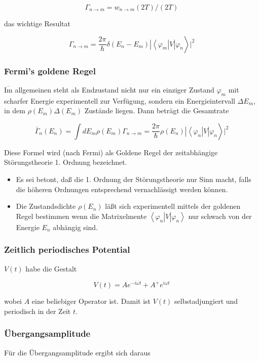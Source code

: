 \documentclass[10pt, letterpaper]{article}
\begin{document}
$$
\Gamma_{n \rightarrow m}=w_{n \rightarrow m}(2 T) /(2 T)
$$

das wichtige Resultat

$$
\left.\Gamma_{n \rightarrow m}=\frac{2 \pi}{\hbar} \delta\left(E_{n}-E_{m}\right)\left|\left\langle\varphi_{m}\right| V\right| \varphi_{n}\right\rangle\left.\right|^{2}
$$

\subsubsection*{Fermi's goldene Regel}
$\overline{\mathrm{Im}}$ allgemeinen steht als Endzustand nicht nur ein einziger Zustand $\varphi_{m}$ mit scharfer Energie experimentell zur Verfügung, sondern ein Energieintervall $\Delta E_{m}$, in dem $\rho\left(E_{m}\right) \Delta\left(E_{m}\right)$ Zustände liegen. Dann beträgt die Gesamtrate

$$
\left.\bar{\Gamma}_{n}\left(E_{n}\right)=\int d E_{m} \rho\left(E_{m}\right) \Gamma_{n \rightarrow m}=\frac{2 \pi}{\hbar} \rho\left(E_{n}\right)\left|\left\langle\varphi_{n}\right| V\right| \varphi_{n}\right\rangle\left.\right|^{2}
$$

Diese Formel wird (nach Fermi) als Goldene Regel der zeitabhängige Störungstheorie 1. Ordnung bezeichnet.

\begin{itemize}
  \item Es sei betont, daß die 1. Ordnung der Störungstheorie nur Sinn macht, falls die höheren Ordnungen entsprechend vernachlässigt werden können.
  \item Die Zustandsdichte $\rho\left(E_{n}\right)$ läßt sich experimentell mittels der goldenen Regel bestimmen wenn die Matrixelmente $\left\langle\varphi_{n}\right| V\left|\varphi_{n}\right\rangle$ nur schwach von der Energie $E_{n}$ abhängig sind.
\end{itemize}

\subsubsection*{Zeitlich periodisches Potential}
$V(t)$ habe die Gestalt

$$
V(t)=A e^{-i \omega t}+A^{+} e^{i \omega t}
$$

wobei $A$ eine beliebiger Operator ist. Damit ist $V(t)$ selbstadjungiert und periodisch in der Zeit $t$.

\subsubsection*{Übergangsamplitude}
Für die Übergangsamplitude ergibt sich daraus
\end{document}
